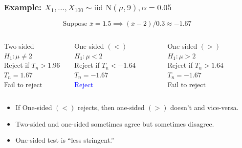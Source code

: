 \begin{frame}
  \frametitle{Example: $X_1, \dots, X_{100} \sim \mbox{iid N}(\mu,9), \alpha = 0.05$}

  \small

  \[\boxed{\mbox{Suppose } \bar{x} = 1.5 \implies (\bar{x} - 2)/0.3 \approx -1.67}\]


  \pause

  \begin{columns}
    \begin{block}{Two-sided}
      $H_1\colon \mu \neq 2$\\
      Reject if $T_n > 1.96$\\
      $T_n = 1.67$\\
      \alert{Fail to reject}
    \end{block}
    \begin{block}{One-sided $(<)$}
      $H_1\colon \mu < 2$\\
      Reject if $T_n < -1.64$\\
      $T_n = -1.67$\\
      \textcolor{blue}{Reject}
    \end{block}
    \begin{block}{One-sided $(>)$}
      $H_1\colon \mu > 2$\\
      Reject if $T_n > 1.64$\\
      $T_n = -1.67$\\
      \alert{Fail to reject}
    \end{block}
  \end{columns}

  \pause

  \vspace{2em}
  \begin{itemize}
    \item If One-sided $(<)$ rejects, then one-sided $(>)$ doesn't and vice-versa. \pause
    \item Two-sided and one-sided sometimes agree but sometimes disagree. \pause
    \item One-sided test is ``less stringent.''
  \end{itemize}
  
\end{frame}
